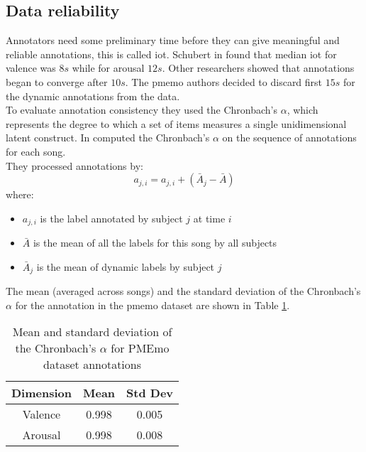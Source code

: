 \subsection{Data reliability}
Annotators need some preliminary time before they can give meaningful and reliable annotations, this is called \gls{iot}. Schubert in \cite{schubert2013reliability} found that median \gls{iot} for valence was $8s$ while for arousal $12s$. Other researchers showed that annotations began to converge after $10s$. The \gls{pmemo} authors decided to discard first $15s$ for the dynamic annotations from the data.
\\ \indent
To evaluate annotation consistency they used the Chronbach's $\alpha$, which represents the degree to which a set of items measures a single unidimensional latent construct. In \cite{zhang2018pmemo} computed the Chronbach's $\alpha$ on the sequence of annotations for each song.
\\
They processed annotations by:
\begin{equation}
	a_{j,i}=a_{j,i}+(\bar{A}_j-\bar{A})
\end{equation}
where:
\begin{itemize}
	\item $a_{j,i}$ is the label annotated by subject $j$ at time $i$
	\item $\bar{A}$ is the mean of all the labels for this song by all subjects
	\item $\bar{A}_j$ is the mean of dynamic labels by subject $j$
\end{itemize}
The mean (averaged across songs) and the standard deviation of the Chronbach's $\alpha$ for the annotation in the \gls{pmemo} dataset are shown in Table \ref{table:Chronbach}.
\begin{table}[h!]
	\centering
	\begin{tabular}{|c|c|c|}
		\hline
		Dimension & Mean & Std Dev \\ [0.5ex] 
		\hline\hline Valence & 0.998 & 0.005 \\ 
		\hline Arousal & 0.998 & 0.008 \\ 
		\hline
	\end{tabular}
	\caption{Mean and standard deviation of the Chronbach's $\alpha$ for PMEmo dataset annotations}
	\label{table:Chronbach}
\end{table}

